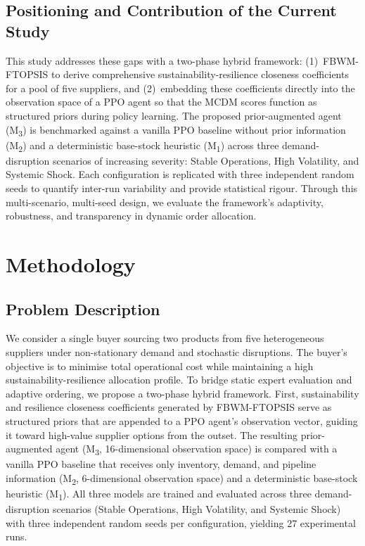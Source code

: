 \documentclass[preprint,12pt]{elsarticle}
\begin{document}
\subsection{Positioning and Contribution of the Current Study}
This study addresses these gaps with a two-phase hybrid framework: (1)~FBWM-FTOPSIS to derive comprehensive sustainability-resilience closeness coefficients for a pool of five suppliers, and (2)~embedding these coefficients directly into the observation space of a PPO agent so that the MCDM scores function as structured priors during policy learning. The proposed prior-augmented agent (M\textsubscript{3}) is benchmarked against a vanilla PPO baseline without prior information (M\textsubscript{2}) and a deterministic base-stock heuristic (M\textsubscript{1}) across three demand-disruption scenarios of increasing severity: Stable Operations, High Volatility, and Systemic Shock. Each configuration is replicated with three independent random seeds to quantify inter-run variability and provide statistical rigour. Through this multi-scenario, multi-seed design, we evaluate the framework's adaptivity, robustness, and transparency in dynamic order allocation.

\section{Methodology}
\label{sec:methodology}
\subsection{Problem Description}
We consider a single buyer sourcing two products from five heterogeneous suppliers under non-stationary demand and stochastic disruptions.
The buyer's objective is to minimise total operational cost while maintaining a high sustainability-resilience allocation profile.
To bridge static expert evaluation and adaptive ordering, we propose a two-phase hybrid framework.
First, sustainability and resilience closeness coefficients generated by FBWM-FTOPSIS serve as structured priors that are appended to a PPO agent's observation vector, guiding it toward high-value supplier options from the outset.
The resulting prior-augmented agent (M\textsubscript{3}, 16-dimensional observation space) is compared with a vanilla PPO baseline that receives only inventory, demand, and pipeline information (M\textsubscript{2}, 6-dimensional observation space) and a deterministic base-stock heuristic (M\textsubscript{1}).
All three models are trained and evaluated across three demand-disruption scenarios (Stable Operations, High Volatility, and Systemic Shock) with three independent random seeds per configuration, yielding 27 experimental runs.
\end{document}
